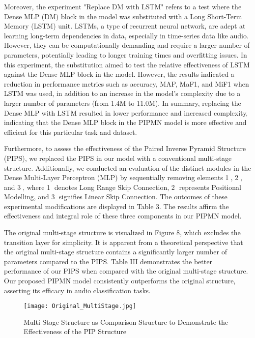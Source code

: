 \documentclass[runningheads]{llncs}
\begin{document}
Moreover, the experiment "Replace DM with LSTM" refers to a test where the Dense MLP (DM) block in the model was substituted with a Long Short-Term Memory (LSTM) unit. LSTMs, a type of recurrent neural network, are adept at learning long-term dependencies in data, especially in time-series data like audio. However, they can be computationally demanding and require a larger number of parameters, potentially leading to longer training times and overfitting issues. In this experiment, the substitution aimed to test the relative effectiveness of LSTM against the Dense MLP block in the model. However, the results indicated a reduction in performance metrics such as accuracy, MAP, MaF1, and MiF1 when LSTM was used, in addition to an increase in the model's complexity due to a larger number of parameters (from 1.4M to 11.0M). In summary, replacing the Dense MLP with LSTM resulted in lower performance and increased complexity, indicating that the Dense MLP block in the PIPMN model is more effective and efficient for this particular task and dataset.

Furthermore, to assess the effectiveness of the Paired Inverse Pyramid Structure (PIPS), we replaced the PIPS in our model with a conventional multi-stage structure. Additionally, we conducted an evaluation of the distinct modules in the Dense Multi-Layer Perceptron (MLP) by sequentially removing elements \textcircled{1}, \textcircled{2}, and \textcircled{3}, where \textcircled{1} denotes Long Range Skip Connection, \textcircled{2} represents Positional Modelling, and \textcircled{3} signifies Linear Skip Connection. The outcomes of these experimental modifications are displayed in Table 3. The results affirm the effectiveness and integral role of these three components in our PIPMN model.

The original multi-stage structure is visualized in Figure 8, which excludes the transition layer for simplicity. It is apparent from a theoretical perspective that the original multi-stage structure contains a significantly larger number of parameters compared to the PIPS. Table III demonstrates the better performance of our PIPS when compared with the original multi-stage structure. Our proposed PIPMN model consistently outperforms the original structure, asserting its efficacy in audio classification tasks.

\begin{figure}
\centering
\texttt{[image: Original\_MultiStage.jpg]}
\caption{Multi-Stage Structure as Comparison Structure to Demonstrate the Effectiveness of the PIP Structure} \label{fig8}
\end{figure}
\end{document}
